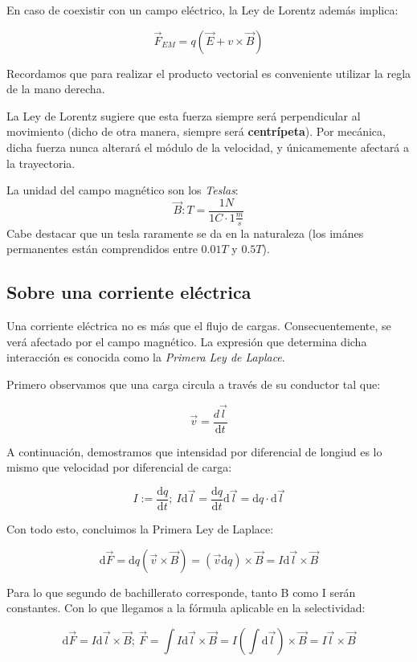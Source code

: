 \documentclass[10pt]{article}
\newcommand{\diff}{\mathrm{d}}
\begin{document}
En caso de coexistir con un campo eléctrico, la Ley de Lorentz además implica:

\[ \vec{F}_{EM} = q (\vec{E} + v \times \vec{B}) \]

Recordamos que para realizar el producto vectorial es conveniente utilizar la regla de la mano derecha.

\begin{remark}
  La Ley de Lorentz sugiere que esta fuerza siempre será perpendicular al movimiento (dicho de otra manera, siempre será \textbf{centrípeta}). Por mecánica, dicha fuerza nunca alterará
  el módulo de la velocidad, y únicamemente afectará a la trayectoria.
\end{remark}

La unidad del campo magnético son los \textit{Teslas}:
\[ \vec{B} : T = \frac{1 N}{1 C \cdot 1 \frac{m}{s}} \]
Cabe destacar que un tesla raramente se da en la naturaleza (los imánes permanentes están comprendidos entre $ 0.01 T $ y $ 0.5 T $).

\subsection{Sobre una corriente eléctrica}

Una corriente eléctrica no es más que el flujo de cargas. Consecuentemente, se verá afectado por el campo magnético. La expresión que determina dicha interacción es conocida como la 
\textit{Primera Ley de Laplace}.

Primero observamos que una carga circula a través de su conductor tal que:

\[ \vec{v} = \frac{d\vec{l}}{\diff t} \]

A continuación, demostramos que intensidad por diferencial de longiud es lo mismo que velocidad por diferencial de carga:

\[ I := \frac{\diff q}{\diff t}; \ I \diff\vec{l} = \frac{\diff q}{\diff t} \diff \vec{l} = \diff q \cdot \diff \vec{l} \]

Con todo esto, concluimos la Primera Ley de Laplace:

\[ \diff \vec{F} = \diff q(\vec{v} \times \vec{B}) = (\vec{v} \diff q) \times \vec{B} = I \diff \vec{l} \times \vec{B} \]

Para lo que segundo de bachillerato corresponde, tanto B como I serán constantes. Con lo que llegamos a la fórmula aplicable en la selectividad:

\[ \diff \vec{F} = I \diff \vec{l} \times \vec{B}; \ \vec{F} = \int I \diff \vec{l} \times \vec{B} = I \left( \int \diff \vec{l} \right) \times \vec{B} = I \vec{l} \times \vec{B} \]
\end{document}
